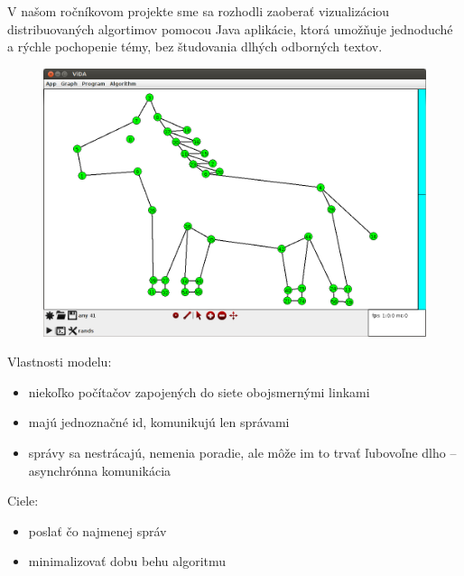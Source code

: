 
V našom ročníkovom projekte sme sa rozhodli zaoberať vi\-zu\-a\-li\-zá\-ciou distribuovaných algortimov
pomocou Java aplikácie, ktorá umožňuje jednoduché a rýchle pochopenie témy, bez
študovania dlhých odborných textov.

\begin{figure}
\includegraphics[width=\columnwidth]{konik}
\end{figure}


Vlastnosti modelu:
\begin{itemize}
    \item niekoľko počítačov zapojených do siete obojsmernými linkami
    \item majú jednoznačné id, komunikujú len správami
    \item správy sa nestrácajú, nemenia poradie, ale môže im to trvať ľubovoľne dlho -- asynchrónna
    komunikácia
\end{itemize}

Ciele:
\begin{itemize}
    \item poslať čo najmenej správ
    \item minimalizovať dobu behu algoritmu
\end{itemize}

